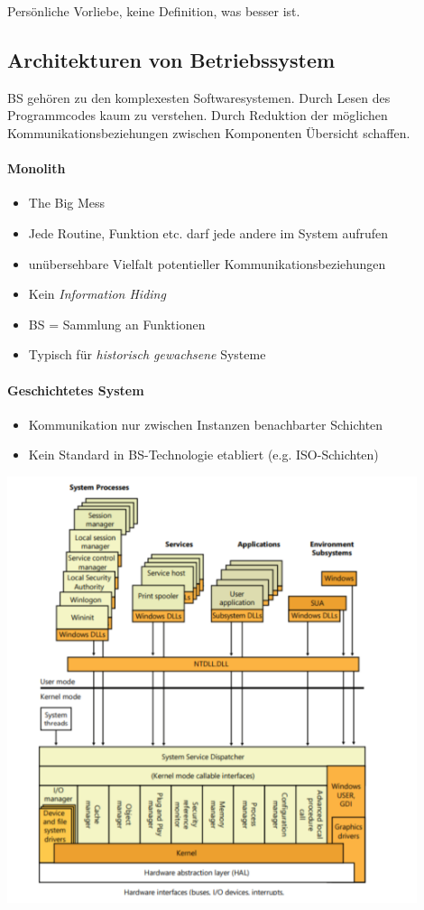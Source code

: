 \documentclass[a4paper,12pt]{article}
\begin{document}
Persönliche Vorliebe, keine Definition, was besser ist.

\subsection{Architekturen von Betriebssystem}
BS gehören zu den komplexesten Softwaresystemen. Durch Lesen des Programmcodes kaum zu verstehen. Durch Reduktion der möglichen Kommunikationsbeziehungen zwischen Komponenten Übersicht schaffen.

\paragraph{Monolith}
\begin{itemize}
\item The Big Mess
\item Jede Routine, Funktion etc. darf jede andere im System aufrufen
\item unübersehbare Vielfalt potentieller Kommunikationsbeziehungen
\item Kein \emph{Information Hiding}
\item BS = Sammlung an Funktionen
\item Typisch für \emph{historisch gewachsene} Systeme
\end{itemize}


\paragraph{Geschichtetes System}
\begin{itemize}
\item Kommunikation nur zwischen Instanzen benachbarter Schichten
\item Kein Standard in BS-Technologie etabliert (e.g. ISO-Schichten)
\end{itemize}

\begin{center}
\includegraphics[width=12cm]{img/01_windows_schichten.png}
\end{center}
\end{document}
